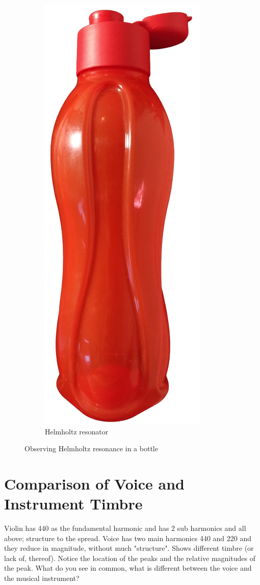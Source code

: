 \documentclass[10pt]{article}
\begin{document}
\begin{figure}[ht]
\begin{subfigure}[b]{0.48\textwidth}
        \includegraphics[scale=0.15]{bottle.png}
        \caption{Helmholtz resonator}
    \end{subfigure}
    \caption{Observing Helmholtz resonance in a bottle\vspace{-0.5cm}}
    \label{helmholtz_resonance}
\end{figure}

\section{Comparison of Voice and Instrument Timbre}
Violin has 440 as the fundamental harmonic and has 2 sub harmonics and all above; structure to the spread. Voice has two main harmonics 440 and 220 and they reduce in magnitude, without much "structure". Shows different timbre (or lack of, thereof). Notice the location of the peaks and the relative magnitudes of the peak. What do you see in common, what is different between the voice and the musical instrument?
\end{document}
